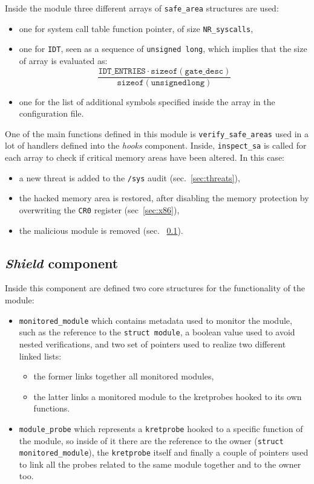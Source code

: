 \documentclass{article}
\begin{document}
	Inside the module three different arrays of \texttt{safe\_area} structures are used:
	\begin{itemize}
		\item one for system call table function pointer, of size \texttt{NR\_syscalls},
		\item one for \texttt{IDT}, seen as a sequence of \texttt{unsigned long}, which implies that the size of array
		is evaluated as:
		\begin{equation*}
			\dfrac{\mathtt{IDT\_ENTRIES} \cdot \mathtt{sizeof(gate\_desc)}}{\mathtt{sizeof(unsigned long)}}
		\end{equation*}
		\item one for the list of additional symbols specified inside the array in the configuration file.
	\end{itemize}

	One of the main functions defined in this module is \texttt{verify\_safe\_areas} used in a lot of handlers defined
	into the \textsl{hooks} component. Inside, \texttt{inspect\_sa} is called for each array to check if
	critical memory areas have been altered. In this case:

	\begin{itemize}
		\item a new threat is added to the \texttt{/sys} audit (sec.~\ref{sec:threats}),
		\item the hacked memory area is restored, after disabling the memory protection by overwriting the \texttt{CR0}
		register (sec~\ref{sec:x86}),
		\item the malicious module is removed (sec. ~\ref{sec:shield}).
	\end{itemize}

	\subsection{\textsl{Shield} component}\label{sec:shield}
	Inside this component are defined two core structures for the functionality of the module:
	\begin{itemize}
		\item \texttt{monitored\_module} which contains metadata used to monitor the module, such as the reference to
		the \texttt{struct module}, a boolean value used to avoid nested verifications, and two set of pointers used to
		realize two different linked lists:
		\begin{itemize}
			\item the former links together all monitored modules,
			\item the latter links a monitored module to the kretprobes hooked to its own functions.
		\end{itemize}

		\item \texttt{module\_probe} which represents a \texttt{kretprobe} hooked to a specific function of the module,
		so inside of it there are the reference to the owner (\texttt{struct monitored\_module}), the
		\texttt{kretprobe} itself and finally a couple of pointers used to link all the probes related to the same
		module together and to the owner too.
	\end{itemize}
\end{document}
